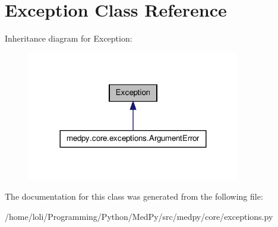 \hypertarget{classException}{
\section{Exception Class Reference}
\label{classException}
}


Inheritance diagram for Exception:\nopagebreak
\begin{figure}[H]
\begin{center}
\leavevmode
\includegraphics[width=264pt]{classException__inherit__graph}
\end{center}
\end{figure}


The documentation for this class was generated from the following file:\begin{DoxyCompactItemize}
\item 
/home/loli/Programming/Python/MedPy/src/medpy/core/exceptions.py\end{DoxyCompactItemize}
